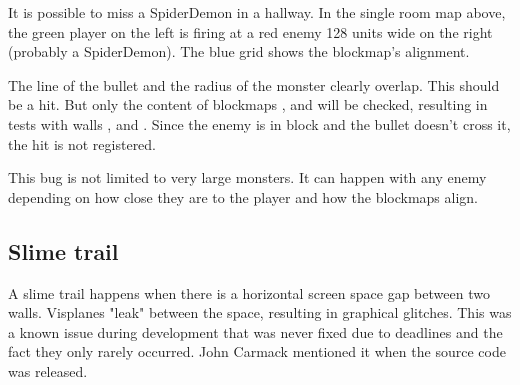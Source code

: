 \par
It is possible to miss a SpiderDemon in a hallway. In the single room map above, the green player on the left is firing at a red enemy 128 units wide on the right (probably a SpiderDemon). The blue grid shows the blockmap's alignment.\\
\par
 The line of the bullet and the radius of the monster clearly overlap. This should be a hit. But only the content of blockmaps ,  and  will be checked, resulting in tests with walls ,  and . Since the enemy is in block  and the bullet doesn't cross it, the hit is not registered.\\
 \par
 This bug is not limited to very large monsters. It can happen with any enemy depending on how close they are to the player and how the blockmaps align.







\subsection{Slime trail}
A slime trail happens when there is a horizontal screen space gap between two walls. Visplanes "leak" between the space, resulting in graphical glitches. This was a known issue during development that was never fixed due to deadlines and the fact they only rarely occurred. John Carmack mentioned it when the  source code was released.\\
\par
{}\\
\par



